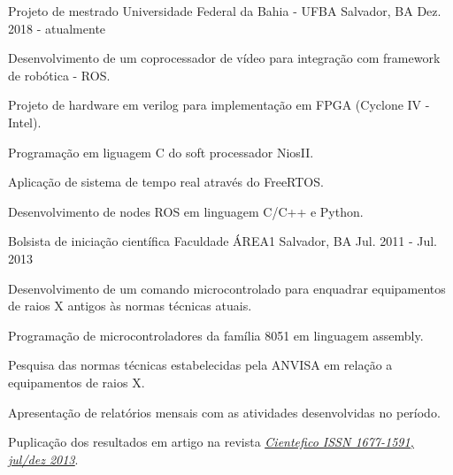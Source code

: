 

\begin{cventries}

  \cventry
    {Projeto de mestrado} %
    {Universidade Federal da Bahia - UFBA} %
    {Salvador, BA} %
    {Dez. 2018 - atualmente} %
    {
      \begin{cvitems} %
        \item {Desenvolvimento de um coprocessador de vídeo para integração com framework de robótica - ROS.}
        \item {Projeto de hardware em verilog para implementação em FPGA (Cyclone IV - Intel).}
        \item {Programação em liguagem C do soft processador NiosII.}
        \item {Aplicação de sistema de tempo real através do FreeRTOS.}
        \item {Desenvolvimento de nodes ROS em linguagem C/C++ e Python.}
      \end{cvitems}
    }

  \cventry
    {Bolsista de iniciação científica} %
    {Faculdade ÁREA1} %
    {Salvador, BA} %
    {Jul. 2011 - Jul. 2013} %
    {
      \begin{cvitems} %
        \item {Desenvolvimento de um comando microcontrolado para enquadrar equipamentos de raios X antigos às normas técnicas atuais.}
        \item {Programação de microcontroladores da família 8051 em linguagem assembly.}
        \item {Pesquisa das normas técnicas estabelecidas pela ANVISA em relação a equipamentos de raios X.}
        \item {Apresentação de relatórios mensais com as atividades desenvolvidas no período.}
        \item {Puplicação dos resultados em artigo na revista \underline{\href{https://cientefico.emnuvens.com.br/cientefico/article/view/58}{\emph{Cientefico ISSN 1677-1591, jul/dez 2013}}}.}
      \end{cvitems}
    }
    

\end{cventries}

